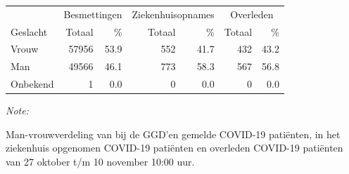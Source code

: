 \documentclass[
  english,
  man,floatsintext]{apa6}
\begin{document}
\begin{table}[H]
\centering\begingroup\fontsize{11}{13}\selectfont

\begin{threeparttable}
\begin{tabular}{lrrrrrr}
\toprule
\multicolumn{1}{c}{ } & \multicolumn{2}{c}{Besmettingen} & \multicolumn{2}{c}{Ziekenhuisopnames} & \multicolumn{2}{c}{Overleden} \\
\cmidrule(l{3pt}r{3pt}){2-3} \cmidrule(l{3pt}r{3pt}){4-5} \cmidrule(l{3pt}r{3pt}){6-7}
Geslacht & Totaal & \% & Totaal & \% & Totaal & \%\\
\midrule
Vrouw & 57956 & 53.9 & 552 & 41.7 & 432 & 43.2\\
Man & 49566 & 46.1 & 773 & 58.3 & 567 & 56.8\\
Onbekend & 1 & 0.0 & 0 & 0.0 & 0 & 0.0\\
\bottomrule
\end{tabular}
\begin{tablenotes}
\item \textit{Note: } 
\item Man-vrouwverdeling van bij de GGD’en gemelde COVID-19 patiënten, in het ziekenhuis opgenomen COVID-19 patiënten en overleden COVID-19 patiënten van 27 oktober t/m 10 november 10:00 uur.
\end{tablenotes}
\end{threeparttable}
\endgroup{}
\end{table}
\newpage
\end{document}
